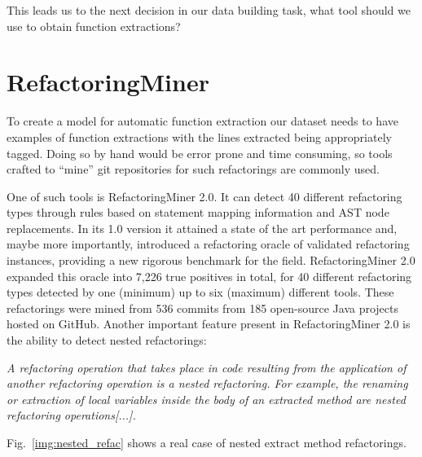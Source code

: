 
 This leads us to the next decision in our data building task, what tool should we use to obtain function extractions?


 \section{RefactoringMiner}


To create a model for automatic function extraction our dataset needs to have examples of function extractions with the lines extracted being appropriately tagged. Doing so by hand would be error prone and time consuming, so tools crafted to ``mine'' git repositories for such refactorings are commonly used.

One of such tools is RefactoringMiner 2.0. It can detect 40 different refactoring types through rules based on statement mapping information and AST node replacements. In its 1.0 version \citep{refactoring_miner1} it attained a state of the art performance and, maybe more importantly, introduced a refactoring oracle of validated refactoring instances, providing a new rigorous benchmark for the field. RefactoringMiner 2.0 expanded this oracle into 7,226 true positives in total, for 40 different refactoring types detected
by one (minimum) up to six (maximum) different tools. These refactorings were mined from 536 commits from 185 open-source Java projects hosted on GitHub.
Another important feature present in RefactoringMiner 2.0 is the ability to detect nested refactorings:

\begin{myquote}
\textit{A refactoring operation that takes place in code resulting from the application of another refactoring operation is a nested refactoring. For example, the renaming or extraction of local variables inside the body of an extracted method are nested refactoring operations[...].}
\\\citet{refactoringminer_2.0}
\end{myquote}

Fig.~\ref{img:nested_refac} shows a real case of nested extract method refactorings. 

